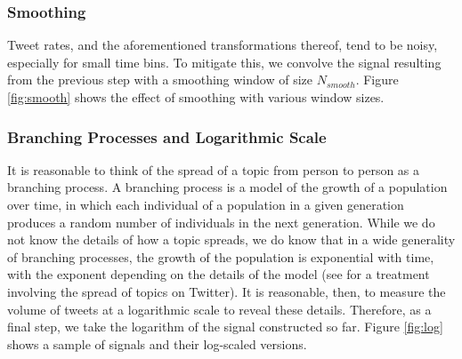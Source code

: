 \subsubsection{Smoothing}
Tweet rates, and the aforementioned transformations thereof, tend to be noisy,
especially for small time bins. To mitigate this, we convolve the signal
resulting from the previous step with a smoothing window of size
$N_{smooth}$. Figure \ref{fig:smooth} shows the effect of smoothing with various
window sizes.

\subsubsection{Branching Processes and Logarithmic Scale}
It is reasonable to think of the spread of a topic from person to person as a
branching process. A branching process is a model of the growth of a population
over time, in which each individual of a population in a given generation
produces a random number of individuals in the next generation. While we do not
know the details of how a topic spreads, we do know that in a wide generality of
branching processes, the growth of the population is exponential with time, with
the exponent depending on the details of the model \cite{AthreyaNey} (see
\cite{Szabo} for a treatment involving the spread of topics on Twitter). It is
reasonable, then, to measure the volume of tweets at a logarithmic scale to
reveal these details. Therefore, as a final step, we take the logarithm of the
signal constructed so far. Figure \ref{fig:log} shows a sample of signals and
their log-scaled versions.

